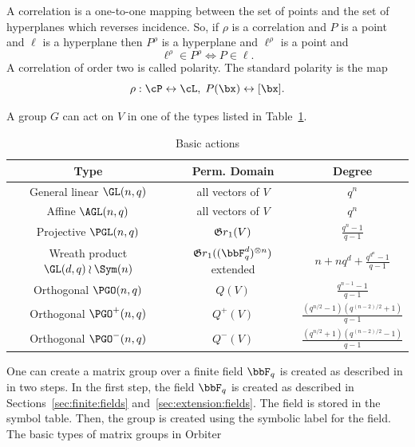  


\bigskip

A correlation is a one-to-one mapping between the set of 
points and the set of hyperplanes which reverses incidence. 
So, if $\rho$ is a correlation and 
$P$ is a point and $\ell$ is a hyperplane then $P^\rho$ is a hyperplane and $\ell^\rho$ is 
a point and 
$$
\ell^\rho \in P^\rho \iff P \in \ell.
$$
A correlation of order two is called polarity.
The standard polarity is the map 
$$
\rho:  \cP \leftrightarrow \cL, \;P(\bx) \leftrightarrow [\bx].
$$





\bigskip

A group $G$ can act on $V$ in one of the types listed in Table~\ref{tab:actions}.
\begin{table}
	\begin{center}
	{\renewcommand{\arraystretch}{2.1}
	\begin{tabular}{|c|c|c|}
		\hline
		Type & Perm. Domain & Degree \\
		\hline
		\hline
		General linear $\GL(n,q)$ & all vectors of $V$ & $q^n$ \\
		\hline
		Affine $\AGL(n,q)$ & all vectors of $V$ & $q^n$ \\
		\hline
		Projective $\PGL(n,q)$& ${\frak Gr}_1(V)$ & $\frac{q^n-1}{q-1}$ \\
		\hline
		Wreath product $\GL(d,q) \wr \Sym(n)$ & ${\frak Gr}_1((\bbF_q^d)^{\otimes n})$ extended &  $n+nq^d+ \frac{q^{d^n}-1}{q-1}$\\
		\hline
		Orthogonal $\PGO(n,q)$& $Q(V)$ &  $\displaystyle \frac{q^{n-1}-1}{q-1}$\\
		\hline
		Orthogonal $\PGO^+(n,q)$& $Q^+(V)$ &  $\displaystyle \frac{(q^{n/2}-1)(q^{(n-2)/2}+1)}{q-1}$ \\
		\hline
		Orthogonal $\PGO^-(n,q)$& $Q^-(V)$ &  $\displaystyle \frac{(q^{n/2}+1)(q^{(n-2)/2}-1)}{q-1}$\\
		\hline
		\end{tabular}}
	\end{center}
	\caption{\label{tab:actions}Basic actions}
	\end{table}
One can create a matrix group over a finite field $\bbF_q$ is created as described in  in two steps. 
In the first step, the field $\bbF_q$ is created as described in Sections~\ref{sec:finite:fields} and~\ref{sec:extension:fields}.
The field is stored in the symbol table.
Then, the group is created using the symbolic label for the field.
The basic types of matrix groups in Orbiter 
